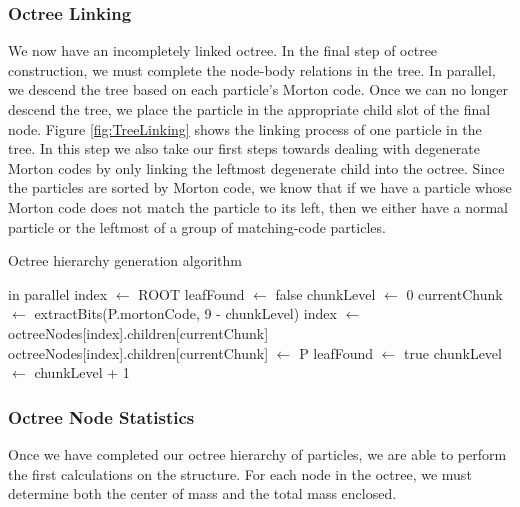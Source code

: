 \documentclass{thesis}
\begin{document}
\subsubsection{Octree Linking}
We now have an incompletely linked octree. In the final step of octree construction, we must complete the node-body relations in the tree. In parallel, we descend the tree based on each particle's Morton code. Once we can no longer descend the tree, we place the particle in the appropriate child slot of the final node. Figure \ref{fig:TreeLinking} shows the linking process of one particle in the tree. In this step we also take our first steps towards dealing with degenerate  Morton codes by only linking the leftmost degenerate child into the octree. Since the particles are sorted by  Morton code, we know that if we have a particle whose  Morton code does not match the particle to its left, then we either have a normal particle or the leftmost of a group of matching-code particles.

\begin{algorithm}
    \label{alg:LinkOctree}
    \caption{Octree hierarchy generation algorithm}
    \begin{algorithmic}
         in parallel
                \State index $\gets$ ROOT
                \State leafFound $\gets$ false
                \State chunkLevel $\gets$ 0
                    \State currentChunk $\gets$ extractBits(P.mortonCode, 9 - chunkLevel)
                        \State index $\gets$ octreeNodes[index].children[currentChunk]
                    \Else
                        \State octreeNodes[index].children[currentChunk] $\gets$ P
                        \State leafFound $\gets$ true
                    \EndIf
                    \State chunkLevel $\gets$ chunkLevel + 1
                \EndWhile
            \EndIf
        \EndFor
    \end{algorithmic}
\end{algorithm}
\subsubsection{Octree Node Statistics} %
Once we have completed our octree hierarchy of particles, we are able to perform the first calculations on the structure. For each node in the octree, we must determine both the center of mass and the total mass enclosed.
\end{document}

